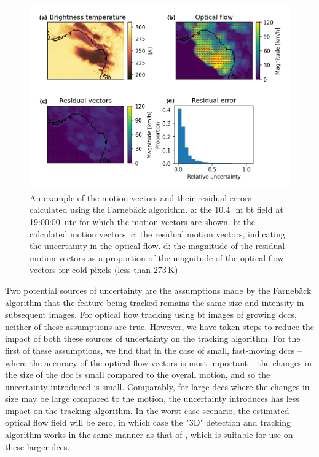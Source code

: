 \begin{figure}[tp]
    \includegraphics[width=\textwidth]{figures/chapter1_14.png}
    \caption[
    An example of the motion vectors and their residual errors calculated using the Farnebäck algorithm
    ]{
    An example of the motion vectors and their residual errors calculated using the Farnebäck algorithm. a: the 10.4\,\unit{\mu m} \acrshort{bt} field at 19:00:00~\acrshort{utc} for which the motion vectors are shown. b: the calculated motion vectors. c: the residual motion vectors, indicating the uncertainty in the optical flow. d: the magnitude of the residual motion vectors as a proportion of the magnitude of the optical flow vectors for cold pixels (less than 273\,\unit{K})
    }
    \label{fig:optical_flow}
\end{figure}


Two potential sources of uncertainty are the assumptions made by the Farnebäck algorithm that the feature being tracked remains the same size and intensity in subsequent images.
For optical flow tracking using \acrshort{bt} images of growing \acrshort{dcc}s, neither of these assumptions are true.
However, we have taken steps to reduce the impact of both these sources of uncertainty on the tracking algorithm.
For the first of these assumptions, we find that in the case of small, fast-moving \acrshort{dcc}s -- where the accuracy of the optical flow vectors is most important -- the changes in the size of the \acrshort{dcc} is small compared to the overall motion, and so the uncertainty introduced is small.
Comparably, for large \acrshort{dcc}s where the changes in size may be large compared to the motion, the uncertainty introduces has less impact on the tracking algorithm.
In the worst-case scenario, the estimated optical flow field will be zero, in which case the "3D" detection and tracking algorithm works in the same manner as that of \citet{fiolleau_algorithm_2013}, which is suitable for use on these larger \acrshort{dcc}s.

